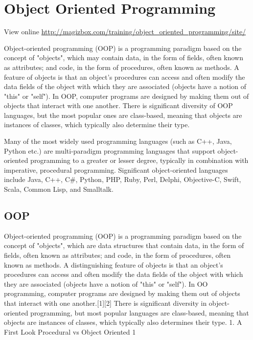 \chapter{Object Oriented Programming}

View online \href{http://magizbox.com/training/object_oriented_programming/site/}{http://magizbox.com/training/object_oriented_programming/site/}

Object-oriented programming (OOP) is a programming paradigm based on the concept of "objects", which may contain data, in the form of fields, often known as attributes; and code, in the form of procedures, often known as methods. A feature of objects is that an object's procedures can access and often modify the data fields of the object with which they are associated (objects have a notion of "this" or "self"). In OOP, computer programs are designed by making them out of objects that interact with one another. There is significant diversity of OOP languages, but the most popular ones are class-based, meaning that objects are instances of classes, which typically also determine their type.

Many of the most widely used programming languages (such as C++, Java, Python etc.) are multi-paradigm programming languages that support object-oriented programming to a greater or lesser degree, typically in combination with imperative, procedural programming. Significant object-oriented languages include Java, C++, C#, Python, PHP, Ruby, Perl, Delphi, Objective-C, Swift, Scala, Common Lisp, and Smalltalk.

\section{OOP}

Object-oriented programming (OOP) is a programming paradigm based on the concept of "objects", which are data structures that contain data, in the form of fields, often known as attributes; and code, in the form of procedures, often known as methods. A distinguishing feature of objects is that an object's procedures can access and often modify the data fields of the object with which they are associated (objects have a notion of "this" or "self"). In OO programming, computer programs are designed by making them out of objects that interact with one another.[1][2] There is significant diversity in object-oriented programming, but most popular languages are class-based, meaning that objects are instances of classes, which typically also determines their type.
1. A First Look
Procedural vs Object Oriented 1

